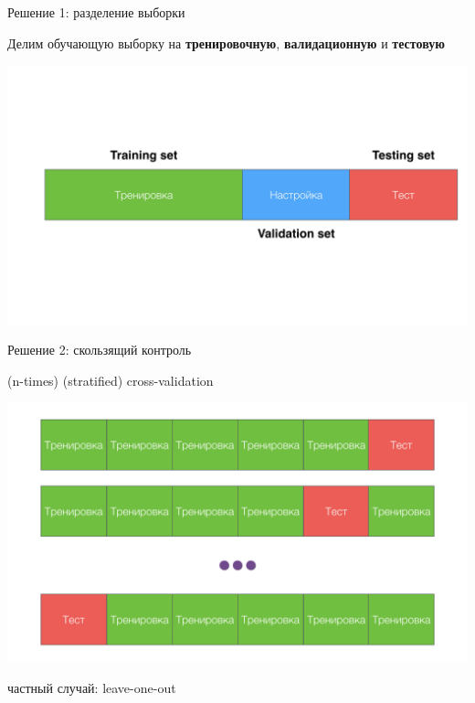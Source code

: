 \documentclass[10pt]{beamer}
\begin{document}
\begin{frame}{Решение 1: разделение выборки}

Делим обучающую выборку на {\bf тренировочную}, {\bf валидационную} и {\bf тестовую}

\begin{center}
\includegraphics[scale=0.15]{images/vtt.png}
\end{center}
  
\end{frame}

\begin{frame}{Решение 2: скользящий контроль}

(n-times) (stratified) cross-validation

\begin{center}
\includegraphics[scale=0.15]{images/cv.png}
\end{center}

частный случай: leave-one-out
  
\end{frame}
\end{document}
